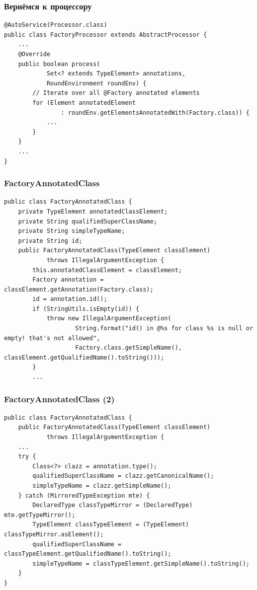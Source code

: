 \documentclass[xetex,mathserif,serif]{beamer}
\begin{document}
	\begin{frame}[fragile]
		\frametitle{Вернёмся к процессору}
		\begin{verbatim}
@AutoService(Processor.class)
public class FactoryProcessor extends AbstractProcessor {
    ...
    @Override
    public boolean process(
            Set<? extends TypeElement> annotations, 
            RoundEnvironment roundEnv) {
        // Iterate over all @Factory annotated elements
        for (Element annotatedElement 
                : roundEnv.getElementsAnnotatedWith(Factory.class)) {
            ...
        }
    }
    ...
}
		\end{verbatim}
	\end{frame}

	\begin{frame}[fragile]
		\frametitle{FactoryAnnotatedClass}
		\begin{footnotesize}
			\begin{verbatim}
public class FactoryAnnotatedClass {
    private TypeElement annotatedClassElement; 
    private String qualifiedSuperClassName;
    private String simpleTypeName; 
    private String id;
    public FactoryAnnotatedClass(TypeElement classElement) 
            throws IllegalArgumentException {
        this.annotatedClassElement = classElement;
        Factory annotation = classElement.getAnnotation(Factory.class);
        id = annotation.id(); 
        if (StringUtils.isEmpty(id)) {
            throw new IllegalArgumentException(
                    String.format("id() in @%s for class %s is null or empty! that's not allowed",
                    Factory.class.getSimpleName(), classElement.getQualifiedName().toString()));
        }
        ...
			\end{verbatim}
		\end{footnotesize}
	\end{frame}

	\begin{frame}[fragile]
		\frametitle{FactoryAnnotatedClass (2)}
		\begin{footnotesize}
			\begin{verbatim}
public class FactoryAnnotatedClass {
    public FactoryAnnotatedClass(TypeElement classElement) 
            throws IllegalArgumentException {
    ...
    try {
        Class<?> clazz = annotation.type();
        qualifiedSuperClassName = clazz.getCanonicalName();
        simpleTypeName = clazz.getSimpleName();
    } catch (MirroredTypeException mte) {
        DeclaredType classTypeMirror = (DeclaredType) mte.getTypeMirror();
        TypeElement classTypeElement = (TypeElement) classTypeMirror.asElement();
        qualifiedSuperClassName = classTypeElement.getQualifiedName().toString();
        simpleTypeName = classTypeElement.getSimpleName().toString();
    }
}
			\end{verbatim}
		\end{footnotesize}
	\end{frame}
\end{document}

